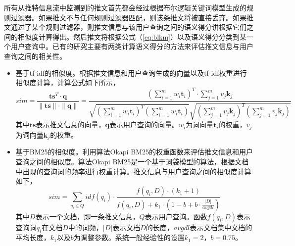 所有从推特信息流中监测到的推文首先都会经过根据布尔逻辑关键词模型生成的规则过滤器。如果推文不与任何规则过滤器匹配，则该条推文将被直接丢弃。如果推文通过了某个规则过滤器，则推文信息与该用户查询之间的语义得分讲根据它们之间的相似度计算得出。然后推文将根据公式（\ref{eq:blkm}）以及语义得分分类到某一个用户查询中。已有的研究主要有两类计算语义得分的方法来评估推文信息与用户查询之间的相关性。
\begin{itemize}
  \item 基于tf-idf的相似度。根据推文信息和用户查询生成的向量以及tf-idf权重进行相似度计算，计算公式如下所示，
  \begin{equation}
  \label{eq:tf-idf}
  sim = \frac{\mathbf{ts}^T \cdot \mathbf{q}}{\|\mathbf{ts}\| \cdot \|\mathbf{q}\|} = \frac{\left(\sum \limits_{i=1}^m {w_i \mathbf{t}_i}\right)^T \cdot \sum \limits_{j=1}^m {v_j \mathbf{k}_j}}{\sqrt{\left(\sum \limits_{i=1}^m {w_i \mathbf{t}_i}\right)^T \left(\sum \limits_{i=1}^m {w_i \mathbf{t}_i}\right)}\sqrt{\left(\sum \limits_{j=1}^m {v_j \mathbf{k}_j}\right)^T \left(\sum \limits_{j=1}^m {v_j \mathbf{k}_j}\right)}}
  \end{equation}
  其中$\mathbf{ts}$表示推文信息的向量，$\mathbf{q}$表示用户查询的向量。$w_i$为词向量$\mathbf{t}_i$的权重，$v_j$为词向量$\mathbf{k}_j$的权重。
  \item 基于BM25的相似度。利用算法Okapi BM25的权重函数来评估推文信息和用户查询之间的相似度。算法Okapi BM25是一个基于词袋模型的算法，根据文档中出现的查询词的频率进行权重计算。推文信息与用户查询之间的相似度计算如下，
  \begin{equation}
  \label{eq:bm25}
  sim = \sum \limits_{q_i \in Q} {idf\left(q_i\right) \cdot \frac{ f\left(q_i,D\right) \cdot \left(k_1 + 1\right)}{f\left(q_i,D\right) + k_1 \cdot \left(1-b+b\cdot\frac{|D|}{avgdl}\right)}}
  \end{equation}
  其中$D$表示一个文档，即一条推文信息，$Q$表示用户查询。函数$f\left(q_i,D\right)$表示查询词$q_i$在文档$D$中的词频，$|D|$表示文档$D$的长度，$avgdl$表示文档集中文档的平均长度，$k_1$以及$b$为调整参数。系统一般经验性的设置$k_1=2$，$b=0.75$。
\end{itemize}

